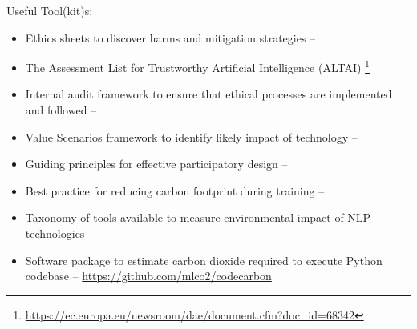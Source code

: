 \noindent Useful Tool(kit)s: 
\begin{itemize}
    \item Ethics sheets to discover harms and mitigation strategies -- \citet{mohammad_ethics_2022}
    \item The Assessment List for Trustworthy Artificial Intelligence (ALTAI) \footnote{\url{https://ec.europa.eu/newsroom/dae/document.cfm?doc_id=68342}}
    \item Internal audit framework to ensure that ethical processes are implemented and followed -- \citet{raji_closing_2020}
    \item Value Scenarios framework to identify likely impact of technology -- \citet{nathan_value_2007}
    \item Guiding principles for effective participatory design -- \citet{caselli_guiding_2021}
    \item Best practice for reducing carbon footprint during training -- \citet{patterson_carbon_2022}
    \item Taxonomy of tools available to measure environmental impact of NLP technologies -- \citet{bannour_evaluating_2021}
    \item Software package to estimate carbon dioxide required to execute Python codebase -- \url{https://github.com/mlco2/codecarbon} 
\end{itemize}